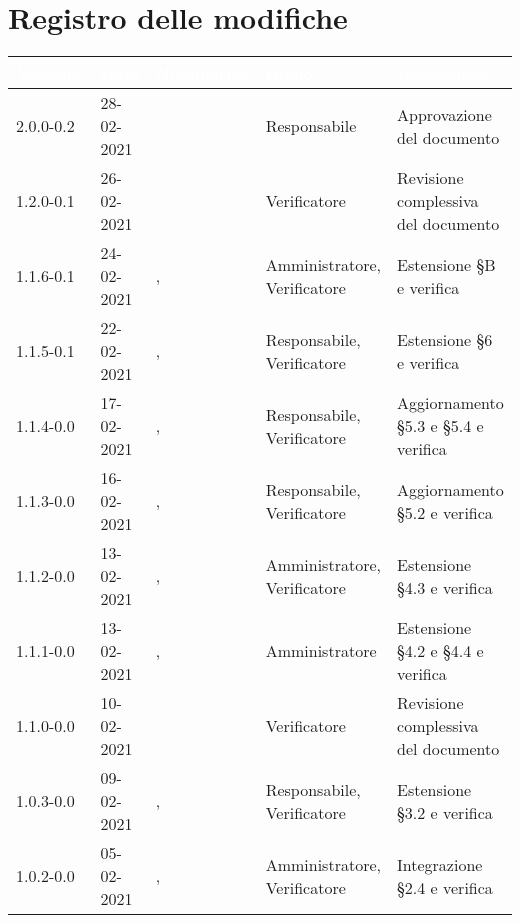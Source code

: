 \section*{Registro delle modifiche}
{
\setcounter{table}{-1}
{
\renewcommand{\arraystretch}{1.5}
\centering
\begin{longtable}{C{1.7cm} C{2.2cm} C{3.2cm} C{3cm} C{4.8cm}}
\textcolor{white}{\textbf{Versione}}&
\textcolor{white}{\textbf{Data}}&
\textcolor{white}{\textbf{Nominativo}}&
\textcolor{white}{\textbf{Ruolo}}&
\textcolor{white}{\textbf{Descrizione}}\\	
\endhead

2.0.0-0.2 & 28-02-2021 & \ZM{} & Responsabile & Approvazione del documento\\

1.2.0-0.1 & 26-02-2021 & \SP{} & Verificatore & Revisione complessiva del documento\\

1.1.6-0.1 & 24-02-2021 & \SG{}, \SP{} & Amministratore, Verificatore & Estensione \S B e verifica\\

1.1.5-0.1 & 22-02-2021 & \ZM{}, \SP{} & Responsabile, Verificatore & Estensione \S 6 e verifica\\

1.1.4-0.0 & 17-02-2021 & \PA{}, \ZM{} & Responsabile, Verificatore & Aggiornamento \S 5.3 e \S 5.4 e verifica\\

1.1.3-0.0 & 16-02-2021 & \PA{}, \ZM{} & Responsabile, Verificatore & Aggiornamento \S 5.2 e verifica\\

1.1.2-0.0 & 13-02-2021 & \BM{}, \ZM{} & Amministratore, Verificatore & Estensione \S 4.3 e verifica\\

1.1.1-0.0 & 13-02-2021 & \SG{}, \ZM{} & Amministratore & Estensione \S 4.2 e \S 4.4 e verifica\\

1.1.0-0.0 & 10-02-2021 & \ZM{} & Verificatore & Revisione complessiva del documento\\

1.0.3-0.0 & 09-02-2021 & \PA{}, \SP{} & Responsabile, Verificatore & Estensione \S 3.2 e verifica\\

1.0.2-0.0 & 05-02-2021& \BM{}, \SP{} & Amministratore, Verificatore & Integrazione \S 2.4 e verifica\\


\end{longtable}}}
